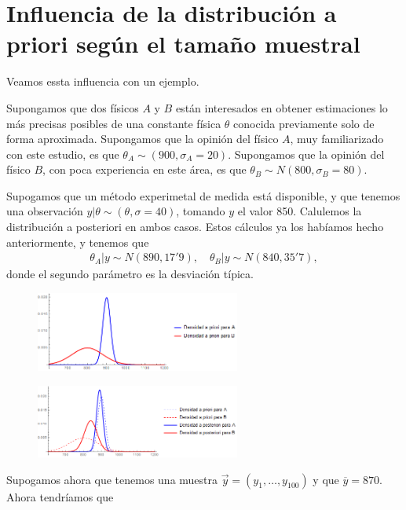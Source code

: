 \section{Influencia de la distribución a priori según el tamaño muestral}
Veamos essta influencia con un ejemplo.
\begin{ejemplo}
    Supongamos que dos físicos $A$ y $B$ están interesados en obtener estimaciones lo más precisas posibles de una constante física $\theta$ conocida previamente solo de forma aproximada. Supongamos que la opinión del físico $A$, muy familiarizado con este estudio, es que $\theta_A \sim (900, \sigma_A = 20)$. Supongamos que la opinión del físico $B$, con poca experiencia en este área, es que $\theta_B \sim N(800, \sigma_B = 80)$.

    Supogamos que un método experimetal de medida está disponible, y que tenemos una observación $y | \theta \sim (\theta, \sigma=40)$, tomando $y$ el valor 850.  Calulemos la distribución a posteriori en ambos casos. Estos cálculos ya los habíamos hecho anteriormente, y tenemos que
    \begin{align*}
        \theta_A | y \sim N(890, 17'9), \quad \theta_B | y \sim N(840, 35'7),
    \end{align*}
    donde el segundo parámetro es la desviación típica.
    \begin{figure}[H]
        \centering
        \includegraphics[width=0.6\textwidth]{imagenes4/apriori.png}
    \end{figure}
    \begin{figure}[H]
        \centering
        \includegraphics[width=0.6\textwidth]{imagenes4/aposte2.png}
    \end{figure}
    Supogamos ahora que tenemos una muestra $\vec{y} = (y_1,\ldots,y_{100})$ y que $\overline{y} = 870$. Ahora tendríamos que
    \begin{align*}

\end{align*}
\end{ejemplo}

